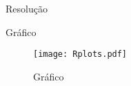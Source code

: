 \documentclass{article}
\begin{document}
\vspace*{-4cm}
\huge{\sffamily \color{black}Resolução}
\lstset{style=mystyle}
\vspace{0.001cm}


\vspace{0.01cm}
\huge{\sffamily \color{black}Gráfico}
\nopagebreak
\vspace{0.001cm}
\begin{figure}[!h] %
    \centering %
    \texttt{[image: Rplots.pdf]} %
    \caption{Gráfico} %
    \label{fig:graph} %
\end{figure}
\end{document}
